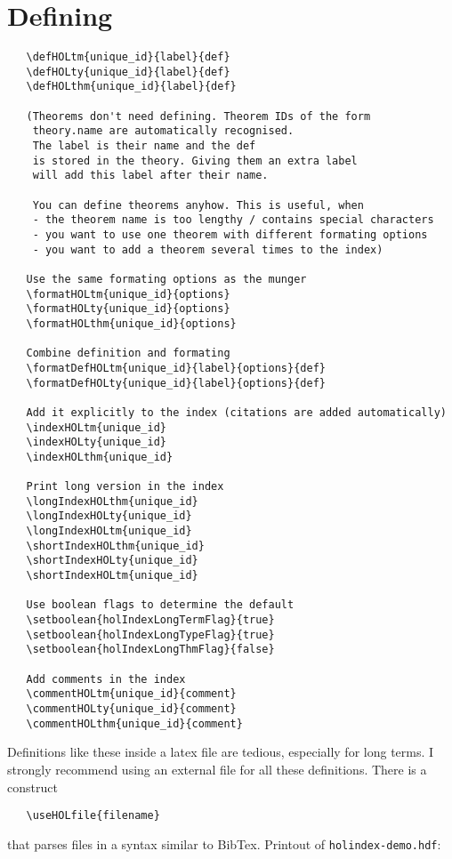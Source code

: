 \documentclass{scrartcl}
\begin{document}
\section{Defining}
\begin{verbatim}
   \defHOLtm{unique_id}{label}{def}
   \defHOLty{unique_id}{label}{def}
   \defHOLthm{unique_id}{label}{def}

   (Theorems don't need defining. Theorem IDs of the form
    theory.name are automatically recognised.
    The label is their name and the def
    is stored in the theory. Giving them an extra label
    will add this label after their name.

    You can define theorems anyhow. This is useful, when
    - the theorem name is too lengthy / contains special characters
    - you want to use one theorem with different formating options
    - you want to add a theorem several times to the index)

   Use the same formating options as the munger
   \formatHOLtm{unique_id}{options}
   \formatHOLty{unique_id}{options}
   \formatHOLthm{unique_id}{options}

   Combine definition and formating
   \formatDefHOLtm{unique_id}{label}{options}{def}
   \formatDefHOLty{unique_id}{label}{options}{def}

   Add it explicitly to the index (citations are added automatically)
   \indexHOLtm{unique_id}
   \indexHOLty{unique_id}
   \indexHOLthm{unique_id}

   Print long version in the index
   \longIndexHOLthm{unique_id}
   \longIndexHOLty{unique_id}
   \longIndexHOLtm{unique_id}
   \shortIndexHOLthm{unique_id}
   \shortIndexHOLty{unique_id}
   \shortIndexHOLtm{unique_id}

   Use boolean flags to determine the default
   \setboolean{holIndexLongTermFlag}{true}
   \setboolean{holIndexLongTypeFlag}{true}
   \setboolean{holIndexLongThmFlag}{false}

   Add comments in the index
   \commentHOLtm{unique_id}{comment}
   \commentHOLty{unique_id}{comment}
   \commentHOLthm{unique_id}{comment}
\end{verbatim}
%
Definitions like these inside a latex file are tedious,
especially for long terms. I strongly recommend using
an external file for all these definitions. There
is a construct
\begin{verbatim}
   \useHOLfile{filename}
\end{verbatim}
that parses files in a syntax similar to BibTex.
Printout of \texttt{holindex-demo.hdf}:
\end{document}
